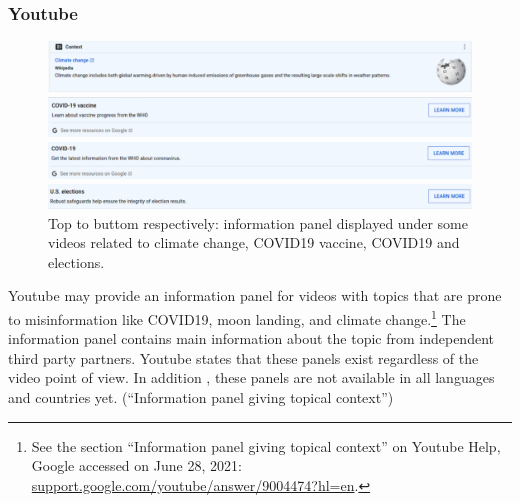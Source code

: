 \documentclass[11pt,a4paper]{article}
\begin{document}
\subsubsection{Youtube}

\begin{figure}
	\centering
	\begin{multicols}{1}
		\includegraphics[scale=0.2]{./img/youtube_panels/yt_1.png} 
	\end{multicols}
	\begin{multicols}{1}
		\includegraphics[scale=0.2]{./img/youtube_panels/yt_2.png} 
	\end{multicols}
	\begin{multicols}{1}
		\includegraphics[scale=0.2]{./img/youtube_panels/yt_3.png}
	\end{multicols}
	\begin{multicols}{1}
		\includegraphics[scale=0.2]{./img/youtube_panels/yt_4.png} 
	\end{multicols}
	\caption{Top to buttom respectively: information panel displayed under some videos related to climate change, COVID19 vaccine, COVID19 and elections.}
	\label{fig9}
\end{figure}

Youtube may provide an information panel for videos with topics that are prone to misinformation like COVID19, moon landing, and climate change.\footnote{See the section ``Information panel giving topical context'' on Youtube Help, Google accessed on June 28, 2021: \href{https://support.google.com/youtube/answer/9004474?hl=en}{support.google.com/youtube/answer/9004474?hl=en}.} The information panel contains main information about the topic from independent third party partners. Youtube states that these panels exist regardless of the video point of view. In addition , these panels are not available in all languages and countries yet. (“Information panel giving topical context”)
\end{document}
